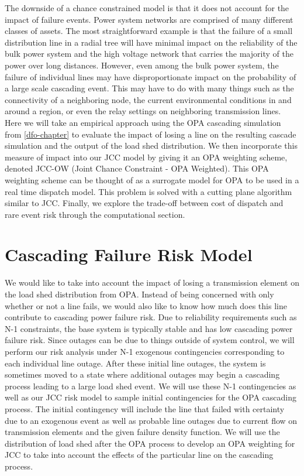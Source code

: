 The downside of a chance constrained model is that it does not account for the impact of failure events.  Power system networks are comprised of many different classes of assets.  The most straightforward example is that the failure of a small distribution line in a radial tree will have minimal impact on the reliability of the bulk power system and the high voltage network that carries the majority of the power over long distances.  However, even among the bulk power system, the failure of individual lines may have disproportionate impact on the probability of a large scale cascading event.  This may have to do with many things such as the connectivity of a neighboring node, the current environmental conditions in and around a region, or even the relay settings on neighboring transmission lines.  Here we will take an empirical approach using the OPA cascading simulation from \cref{dfo-chapter} to evaluate the impact of losing a line on the resulting cascade simulation and the output of the load shed distribution.  We then incorporate this measure of impact into our JCC model by giving it an OPA weighting scheme, denoted JCC-OW (Joint Chance Constraint - OPA Weighted).  This OPA weighting scheme can be thought of as a surrogate model for OPA to be used in a real time dispatch model.  This problem is solved with a cutting plane algorithm similar to JCC.  Finally, we explore the trade-off between cost of dispatch and rare event risk through the computational section.




\section{Cascading Failure Risk Model}
We would like to take into account the impact of losing a transmission element on the load shed distribution from OPA.  Instead of being concerned with only whether or not a line fails, we would also like to know how much does this line contribute to cascading power failure risk.  Due to reliability requirements such as N-1 constraints, the base system is typically stable and has low cascading power failure risk.  Since outages can be due to things outside of system control, we will perform our risk analysis under N-1 exogenous contingencies corresponding to each individual line outage.  After these initial line outages, the system is sometimes moved to a state where additional outages may begin a cascading process leading to a large load shed event.  We will use these N-1 contingencies as well as our JCC risk model to sample initial contingencies for the OPA cascading process.  The initial contingency will include the line that failed with certainty due to an exogenous event as well as probable line outages due to current flow on transmission elements and the given failure density function.  We will use the distribution of load shed after the OPA process to develop an OPA weighting for JCC to take into account the effects of the particular line on the cascading process. 

